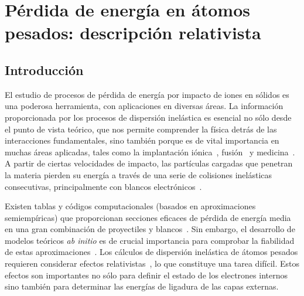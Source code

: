 \chapter{Pérdida de energía en átomos pesados: descripción relativista}
\label{chap:heavy}

\section{Introducción}
\label{sec:intro}

El estudio de procesos de pérdida de energía por impacto de iones 
en sólidos es una poderosa herramienta, con aplicaciones en diversas 
áreas. La información proporcionada por los procesos de dispersión 
inelástica es esencial no sólo desde el punto de vista teórico, que nos 
permite comprender la física detrás de las interacciones fundamentales, 
sino también porque es de vital importancia en muchas áreas aplicadas, 
tales como la implantación iónica~\cite{Creutzburg:19,Jeynes:16}, 
fusión~\cite{Mayer:20,He:17} y 
medicina~\cite{Schardt:10,AlcocerAvila:19,Vera:19}.
A partir de ciertas velocidades de impacto, las partículas cargadas que 
penetran la materia pierden su energía a través de una serie de 
colisiones inelásticas consecutivas, principalmente con blancos 
electrónicos~\cite{Chu:01,Sigmund:06}. 

Existen tablas y códigos computacionales (basados en aproximaciones 
semiempíricas) que proporcionan secciones eficaces de pérdida de energía 
media en una gran combinación de proyectiles y blancos~\cite{iaea_codes,
Paul:03}. Sin embargo, el desarrollo de modelos teóricos 
\textit{ab initio} es de crucial importancia para comprobar la 
fiabilidad de estas aproximaciones~\cite{Diwan:15,Damache:04,Damache:02}.
Los cálculos de dispersión inelástica de átomos pesados requieren 
considerar efectos relativistas~\cite{Montanari:09}, lo que constituye 
una tarea difícil. Estos efectos son importantes no sólo para definir el 
estado de los electrones internos sino también para determinar las 
energías de ligadura de las capas externas.

